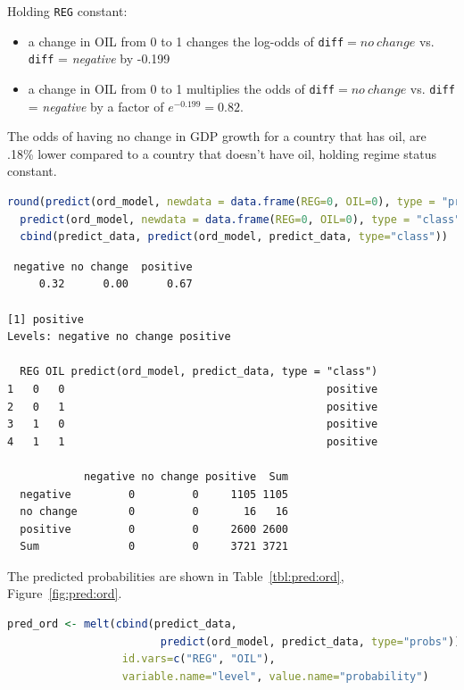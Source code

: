 \documentclass[12pt,letterpaper]{article}
\begin{document}
\begin{enumerate}
  Holding \texttt{REG} constant:
  \begin{itemize}
    \item a change in OIL from 0 to 1 changes the log-odds of  \texttt{diff}$ = no~change$ vs. \texttt{diff} = \emph{negative} by -0.199
    \item a change in OIL from 0 to 1 multiplies the odds of \texttt{diff}$ = no~change$ vs. \texttt{diff} = \emph{negative} by a factor of $e^{-0.199} = 0.82$.
  \end{itemize}

  The odds of having no change in GDP growth for a country that has oil, are .18\% lower compared to a country that doesn't have oil, holding regime status constant.

  \begin{lstlisting}[language=R]
  round(predict(ord_model, newdata = data.frame(REG=0, OIL=0), type = "probs"),2)
  predict(ord_model, newdata = data.frame(REG=0, OIL=0), type = "class")
  cbind(predict_data, predict(ord_model, predict_data, type="class"))
  \end{lstlisting}
  \begin{lstlisting}
 negative no change  positive 
     0.32      0.00      0.67 

[1] positive
Levels: negative no change positive

  REG OIL predict(ord_model, predict_data, type = "class")
1   0   0                                         positive
2   0   1                                         positive
3   1   0                                         positive
4   1   1                                         positive

            negative no change positive  Sum
  negative         0         0     1105 1105
  no change        0         0       16   16
  positive         0         0     2600 2600
  Sum              0         0     3721 3721
\end{lstlisting}

  The predicted probabilities are shown in Table~\ref{tbl:pred:ord}, Figure~\ref{fig:pred:ord}.

  \begin{lstlisting}[language=R]
  pred_ord <- melt(cbind(predict_data, 
                        predict(ord_model, predict_data, type="probs")),
                  id.vars=c("REG", "OIL"), 
                  variable.name="level", value.name="probability")
  \end{lstlisting}
  
  

\end{enumerate}
\end{document}
